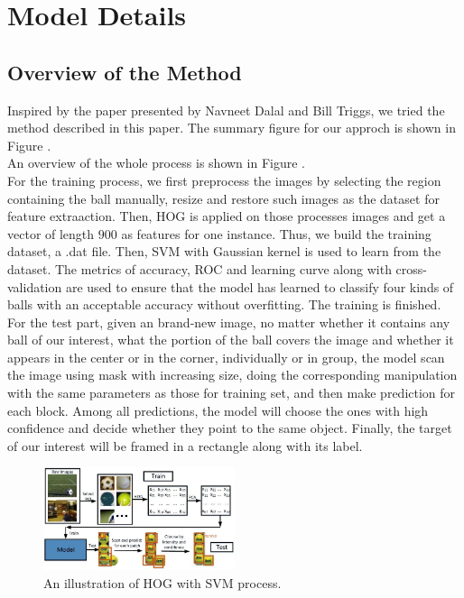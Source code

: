 \documentclass{article}
\begin{document}
\section{Model Details} 

\subsection{Overview of the Method}
Inspired by the paper \cite{dalal2005histograms} presented by Navneet Dalal and Bill Triggs, we tried the method described in this paper. The summary figure for our approch is shown in Figure .\\
An overview of the whole process is shown in Figure \cite{overview}.\\
For the training process, we first preprocess the images by selecting the region containing the ball manually, resize and restore such images as the dataset for feature extraaction. Then, HOG is applied on those processes images and get a vector of length $900$ as features for one instance. Thus, we build the training dataset, a .dat file. Then, SVM with Gaussian kernel is used to learn from the dataset. The metrics of accuracy, ROC and learning curve along with cross-validation are used to ensure that the model has learned to classify four kinds of balls with an acceptable accuracy without overfitting. The training is finished. \\
For the test part, given an brand-new image, no matter whether it contains any ball of our interest, what the portion of the ball covers the image and whether it appears in the center or in the corner, individually or in group, the model scan the image using mask with increasing size, doing the corresponding manipulation with the same parameters as those for training set, and then make prediction for each block. Among all predictions, the model will choose the ones with high confidence and decide whether they point to the same object. Finally, the target of our interest will be framed in a rectangle along with its label.

\begin{figure}[htp]
\centering
\includegraphics[width=0.5\textwidth]{overview.jpg}
\caption{An illustration of HOG with SVM process.}
\label{fig:overview}
\end{figure}
\end{document}
